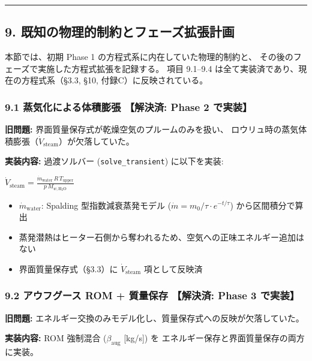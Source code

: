 \documentclass[a4paper,11pt]{article}
\begin{document}
\bigskip\hrule\bigskip

\subsection{9. 既知の物理的制約とフェーズ拡張計画}

本節では、初期 Phase 1 の方程式系に内在していた物理的制約と、
その後のフェーズで実施した方程式拡張を記録する。
項目 9.1--9.4 は全て実装済であり、現在の方程式系（§3.3, §10, 付録C）に反映されている。

\subsubsection{9.1 蒸気化による体積膨張 \textnormal{【解決済: Phase 2 で実装】}}

\textbf{旧問題:} 界面質量保存式が乾燥空気のプルームのみを扱い、
ロウリュ時の蒸気体積膨張（$\dot{V}_{\text{steam}}$）が欠落していた。

\textbf{実装内容:} 過渡ソルバー (\texttt{solve\_transient}) に以下を実装:

$
\dot{V}_{\text{steam}} = \frac{\dot{m}_{\text{water}} \, R \, T_{\text{upper}}}{p \, M_{w,\text{H}_2\text{O}}}
$

\begin{itemize} \item $\dot{m}_{\text{water}}$: Spalding 型指数減衰蒸発モデル ($\dot{m} = m_0/\tau \cdot e^{-t/\tau}$) から区間積分で算出 \end{itemize}
\begin{itemize} \item 蒸発潜熱はヒーター石側から奪われるため、空気への正味エネルギー追加はない \end{itemize}
\begin{itemize} \item 界面質量保存式（§3.3）に $\dot{V}_{\text{steam}}$ 項として反映済 \end{itemize}

\subsubsection{9.2 アウフグース ROM + 質量保存 \textnormal{【解決済: Phase 3 で実装】}}

\textbf{旧問題:} エネルギー交換のみモデル化し、質量保存式への反映が欠落していた。

\textbf{実装内容:} ROM 強制混合 ($\beta_{\text{aug}}$ [kg/s]) を
エネルギー保存と界面質量保存の両方に実装。
\end{document}
